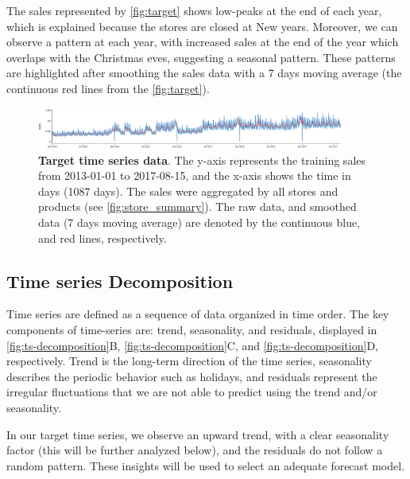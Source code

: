 The sales represented by \autoref{fig:target} shows low-peaks at the end of each year, which is explained because the stores are closed at New years. Moreover, we can observe a pattern at each year, with increased sales at the end of the year which overlaps with the Christmas eves, suggesting a seasonal pattern. These patterns are highlighted after smoothing the sales data  with a 7 days moving average (the continuous red lines from the \autoref{fig:target}).

\begin{figure}[!htb]
  \centering
  \includegraphics[width=0.9\textwidth]{plots/eda/target-time-series-plot-DF-testProc.png}
  \caption[Target time series data]{\textbf{Target time series data}. The y-axis represents the training sales from 2013-01-01 to 2017-08-15, and the x-axis shows the time in days (1087 days). The sales were aggregated by all stores and products (see \autoref{fig:store_summary}). The raw data, and smoothed data (7 days moving average) are denoted by the continuous blue, and red lines, respectively.}
  \label{fig:target}
\end{figure}

\subsection[Time series Decomposition]{Time series Decomposition}
\label{sec:decomposition}

Time series are defined as a sequence of data organized in time order. The key components of time-series are: trend, seasonality, and residuals, displayed in \autoref{fig:ts-decomposition}B, \autoref{fig:ts-decomposition}C, and \autoref{fig:ts-decomposition}D, respectively. Trend is the long-term direction of the time series, seasonality describes the periodic behavior such as holidays, and residuals represent the irregular fluctuations that we are not able to predict using the trend and/or seasonality.\autocite{moroff2021machine} 

In our target time series, we observe an upward trend, with a clear seasonality factor (this will be further analyzed below), and the residuals do not follow a random pattern. These insights will be used to select an adequate forecast model. 

